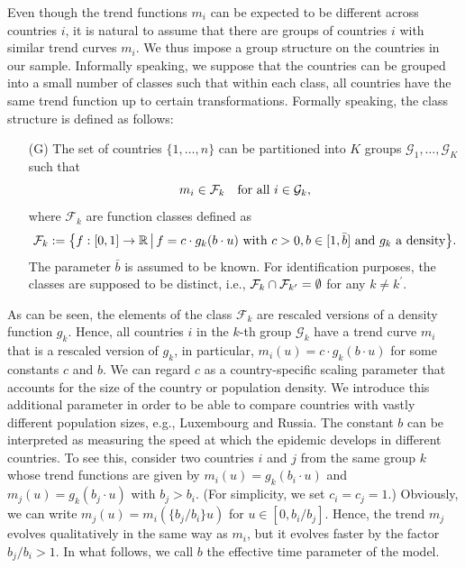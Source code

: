 \documentclass[a4paper,12pt]{article}
\numberwithin{equation}{section}
\begin{document}
Even though the trend functions $m_i$ can be expected to be different across countries $i$, it is natural to assume that there are groups of countries $i$ with similar trend curves $m_i$. We thus impose a group structure on the countries in our sample. Informally speaking, we suppose that the countries can be grouped into a small number of classes such that within each class, all countries have the same trend function up to certain transformations. Formally speaking, the class structure is defined as follows: 
\begin{enumerate}[leftmargin=0.8cm]
\item[(G)] The set of countries $\{1,\ldots,n\}$ can be partitioned into $K$ groups $\mathcal{G}_1,\ldots,\mathcal{G}_K$ such that 
\[ m_i \in \mathcal{F}_k \quad \text{for all } i \in \mathcal{G}_k, \]
where $\mathcal{F}_k$ are function classes defined as
\[ \mathcal{F}_k := \big\{ f:[0, 1] \rightarrow \mathbb{R} \,\big|\, f = c \cdot g_k(b \cdot u) \text{ with } c > 0, b \in [1, \bar{b}] \text{ and } g_k \text{ a density} \big\}. \]
The parameter $\bar{b}$ is assumed to be known. For identification purposes, the classes are supposed to be distinct, i.e., $\mathcal{F}_k \cap \mathcal{F}_{k^\prime} = \emptyset$ for any $k \neq k^\prime$. 
\end{enumerate}
As can be seen, the elements of the class $\mathcal{F}_k$ are rescaled versions of a density function $g_k$. Hence, all countries $i$ in the $k$-th group $\mathcal{G}_k$ have a trend curve $m_i$ that is a rescaled version of $g_k$, in particular, $m_i(u) = c \cdot g_k(b \cdot u)$ for some constants $c$ and $b$. We can regard $c$ as a country-specific scaling parameter that accounts for the size of the country or population density. We introduce this additional parameter in order to be able to compare countries with vastly different population sizes, e.g., Luxembourg and Russia. The constant $b$ can be interpreted as measuring the speed at which the epidemic develops in different countries. To see this, consider two countries $i$ and $j$ from the same group $k$ whose trend functions are given by $m_i(u) = g_k(b_i \cdot u)$ and $m_j(u) = g_k(b_j \cdot u)$ with $b_j > b_i$. (For simplicity, we set $c_i = c_j = 1$.) Obviously, we can write $m_j(u) = m_i(\{b_j/b_i\} u)$ for $u \in [0,b_i/b_j]$. Hence, the trend $m_j$ evolves qualitatively in the same way as $m_i$, but it evolves faster by the factor $b_j/b_i > 1$. 
In what follows, we call $b$ the effective time parameter of the model. 
\end{document}

